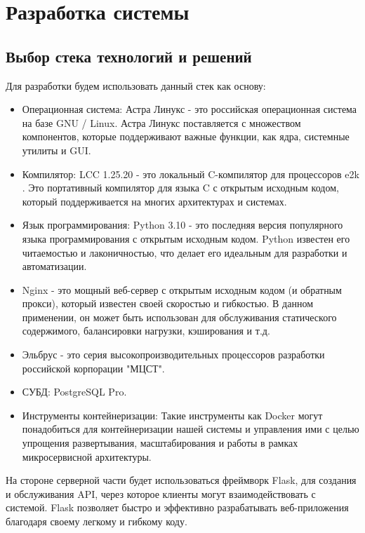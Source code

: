\chapter{Разработка системы}
\label{cha:impl}

\section{Выбор стека технологий и решений}

Для разработки будем использовать данный стек как основу:

\begin{itemize}
    \item Операционная система: Астра Линукс - это российская операционная система на базе GNU / Linux. Астра Линукс поставляется с множеством компонентов, которые поддерживают важные функции, как ядра, системные утилиты и GUI. \cite{dev:astra_linux}
    \item Компилятор: LCC 1.25.20 - это локальный C-компилятор для процессоров e2k \cite{dev:elbrus_lcc}. Это портативный компилятор для языка C с открытым исходным кодом, который поддерживается на многих архитектурах и системах.
    \item Язык программирования: Python 3.10 - это последняя версия популярного языка программирования с открытым исходным кодом. Python известен его читаемостью и лаконичностью, что делает его идеальным для разработки и автоматизации.
    \item Nginx - это мощный веб-сервер с открытым исходным кодом (и обратным прокси), который известен своей скоростью и гибкостью. В данном применении, он может быть использован для обслуживания статического содержимого, балансировки нагрузки, кэширования и т.д.
    \item Эльбрус - это серия высокопроизводительных процессоров разработки российской корпорации "МЦСТ". \cite{dev:elbrus_cpu}
    \item СУБД: PostgreSQL Pro.
    \item Инструменты контейнеризации: Такие инструменты как Docker могут понадобиться для контейнеризации нашей системы и управления ими с целью упрощения развертывания, масштабирования и работы в рамках микросервисной архитектуры.


\end{itemize}

На стороне серверной части будет использоваться фреймворк Flask, для создания и обслуживания API, через которое клиенты могут взаимодействовать с системой. Flask позволяет быстро и эффективно разрабатывать веб-приложения благодаря своему легкому и гибкому коду. 

